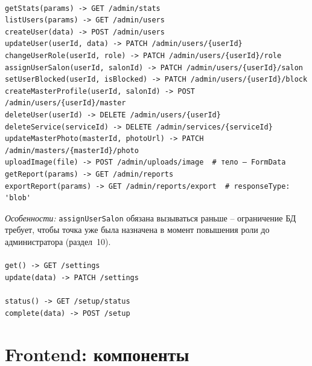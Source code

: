 \paragraph{}
\begin{verbatim}
getStats(params) -> GET /admin/stats
listUsers(params) -> GET /admin/users
createUser(data) -> POST /admin/users
updateUser(userId, data) -> PATCH /admin/users/{userId}
changeUserRole(userId, role) -> PATCH /admin/users/{userId}/role
assignUserSalon(userId, salonId) -> PATCH /admin/users/{userId}/salon
setUserBlocked(userId, isBlocked) -> PATCH /admin/users/{userId}/block
createMasterProfile(userId, salonId) -> POST /admin/users/{userId}/master
deleteUser(userId) -> DELETE /admin/users/{userId}
deleteService(serviceId) -> DELETE /admin/services/{serviceId}
updateMasterPhoto(masterId, photoUrl) -> PATCH /admin/masters/{masterId}/photo
uploadImage(file) -> POST /admin/uploads/image  # тело — FormData
getReport(params) -> GET /admin/reports
exportReport(params) -> GET /admin/reports/export  # responseType: 'blob'
\end{verbatim}
\textit{Особенности:} \texttt{assignUserSalon} обязана вызываться раньше
 -- ограничение БД
 требует, чтобы точка уже была
назначена в момент повышения роли до администратора (раздел~10).

\paragraph{}
\begin{verbatim}
get() -> GET /settings
update(data) -> PATCH /settings
\end{verbatim}

\paragraph{}
\begin{verbatim}
status() -> GET /setup/status
complete(data) -> POST /setup
\end{verbatim}

\section{Frontend: компоненты}

